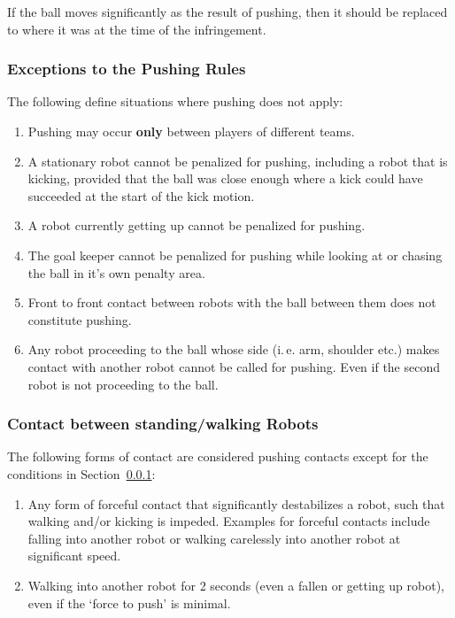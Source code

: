 \documentclass[12pt]{article}
\newcommand{\ie}{\mbox{i.\,e.}\xspace}
\begin{document}
If the ball moves significantly as the result of pushing, then it should be replaced to where it was at the time of the infringement.

\subsubsection{Exceptions to the Pushing Rules}
\label{sec:situations_no_pushing}

The following define situations where pushing does not apply:

\begin{enumerate}
	\item Pushing may occur \textbf{only} between players of different teams.
	\item A stationary robot cannot be penalized for pushing, including a robot that is kicking, provided that the ball was close enough where a kick could have succeeded at the start of the kick motion.
	\item A robot currently getting up cannot be penalized for pushing.
	\item The goal keeper cannot be penalized for pushing while looking at or chasing the ball in it's own penalty area.
	\item Front to front contact between robots with the ball between them does not constitute pushing.
	\item Any robot proceeding to the ball whose side (\ie arm, shoulder etc.) makes contact with another robot cannot be called for pushing. Even if the second robot is not proceeding to the ball.
\end{enumerate}

\subsubsection{Contact between standing/walking Robots}
\label{sec:pushing_contact}

The following forms of contact are considered pushing contacts except for the conditions in Section~\ref{sec:situations_no_pushing}:
\begin{enumerate}
	\item Any form of forceful contact that significantly destabilizes a robot, such that walking and/or kicking is impeded. Examples for forceful contacts include falling into another robot or walking carelessly into another robot at significant speed.
	\item Walking into another robot for 2 seconds (even a fallen or getting up robot), even if the `force to push' is minimal.
\end{enumerate}
\end{document}
